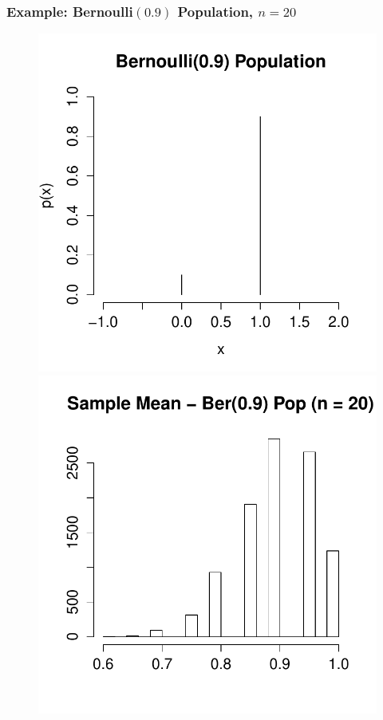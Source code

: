 \documentclass[handout]{beamer}
\begin{document}
\begin{frame}
\frametitle{Example: Bernoulli$(0.9)$ Population, $n =20$}
\begin{figure}
\centering
\includegraphics[scale = 0.4]{./images/bernoulli_bad}
\includegraphics[scale = 0.4]{./images/xbar_bernoulli_bad}
\end{figure}
\end{frame}
\end{document}
